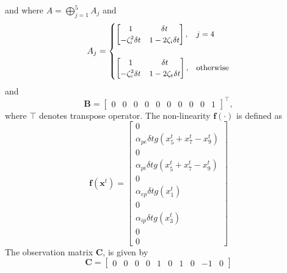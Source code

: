 \documentclass[]{article}
\begin{document}
and where $A=\bigoplus_{j=1}^5A_j$
and
\begin{equation}
	A_j=\small{
	\begin{cases} 
		\begin{bmatrix}1&\delta t\\-\zeta_i^2\delta t&1-2\zeta_i\delta t\end{bmatrix}, & j=4\\ \\
 \begin{bmatrix}1&\delta t\\-\zeta_e^2\delta t&1-2\zeta_e\delta t\end{bmatrix}, & \mathrm{otherwise}
	\end{cases}}		
\end{equation} 
and
\begin{equation}
	\mathbf{B}=\begin{bmatrix}0&0&0&0&0&0&0&0&0&1\end{bmatrix}^{\top},
	\end{equation} 
where $\top$ denotes transpose operator. The non-linearity $\mathbf f(\cdot)$ is defined as
\begin{equation}
 \mathbf{f}(\mathbf{x}^t)= \begin{bmatrix}0\\ \alpha_{pe}\delta t g\left(x_{5}^{t}+x_{7}^{t}-x_{9}^{t}\right)\\0\\\alpha_{pi}\delta t g\left(x_{5}^{t}+x_{7}^{t}-x_{9}^{t}\right)\\0\\\alpha_{ep}\delta t g\left(x_1^{t}\right)\\0\\\alpha_{ip}\delta t g\left(x_3^{t}\right)\\0\\0\end{bmatrix}
\end{equation}  
The observation matrix $\mathbf C$, is given by
\begin{equation}
 \mathbf{C}=\begin{bmatrix}0&0&0&0&1&0&1&0&-1&0\end{bmatrix} 
\end{equation}
\end{document}

